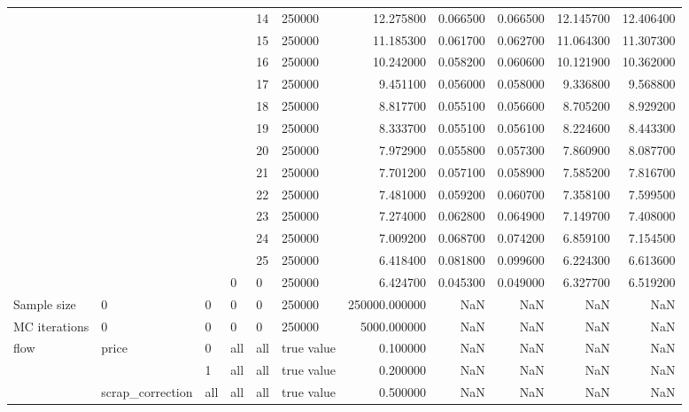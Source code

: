 \begin{tabular}{llllllrrrrr}
\cline{5-11}
 &  &  &  & 14 & 250000 & 12.275800 & 0.066500 & 0.066500 & 12.145700 & 12.406400 \\
\cline{5-11}
 &  &  &  & 15 & 250000 & 11.185300 & 0.061700 & 0.062700 & 11.064300 & 11.307300 \\
\cline{5-11}
 &  &  &  & 16 & 250000 & 10.242000 & 0.058200 & 0.060600 & 10.121900 & 10.362000 \\
\cline{5-11}
 &  &  &  & 17 & 250000 & 9.451100 & 0.056000 & 0.058000 & 9.336800 & 9.568800 \\
\cline{5-11}
 &  &  &  & 18 & 250000 & 8.817700 & 0.055100 & 0.056600 & 8.705200 & 8.929200 \\
\cline{5-11}
 &  &  &  & 19 & 250000 & 8.333700 & 0.055100 & 0.056100 & 8.224600 & 8.443300 \\
\cline{5-11}
 &  &  &  & 20 & 250000 & 7.972900 & 0.055800 & 0.057300 & 7.860900 & 8.087700 \\
\cline{5-11}
 &  &  &  & 21 & 250000 & 7.701200 & 0.057100 & 0.058900 & 7.585200 & 7.816700 \\
\cline{5-11}
 &  &  &  & 22 & 250000 & 7.481000 & 0.059200 & 0.060700 & 7.358100 & 7.599500 \\
\cline{5-11}
 &  &  &  & 23 & 250000 & 7.274000 & 0.062800 & 0.064900 & 7.149700 & 7.408000 \\
\cline{5-11}
 &  &  &  & 24 & 250000 & 7.009200 & 0.068700 & 0.074200 & 6.859100 & 7.154500 \\
\cline{5-11}
 &  &  &  & 25 & 250000 & 6.418400 & 0.081800 & 0.099600 & 6.224300 & 6.613600 \\
\cline{4-11} \cline{5-11}
 &  &  & 0 & 0 & 250000 & 6.424700 & 0.045300 & 0.049000 & 6.327700 & 6.519200 \\
\cline{1-11} \cline{2-11} \cline{3-11} \cline{4-11} \cline{5-11}
Sample size & 0 & 0 & 0 & 0 & 250000 & 250000.000000 & NaN & NaN & NaN & NaN \\
\cline{1-11} \cline{2-11} \cline{3-11} \cline{4-11} \cline{5-11}
MC iterations & 0 & 0 & 0 & 0 & 250000 & 5000.000000 & NaN & NaN & NaN & NaN \\
\cline{1-11} \cline{2-11} \cline{3-11} \cline{4-11} \cline{5-11}
\multirow[t]{37}{*}{flow} & \multirow[t]{2}{*}{price} & 0 & all & all & true value & 0.100000 & NaN & NaN & NaN & NaN \\
\cline{3-11} \cline{4-11} \cline{5-11}
 &  & 1 & all & all & true value & 0.200000 & NaN & NaN & NaN & NaN \\
\cline{2-11} \cline{3-11} \cline{4-11} \cline{5-11}
 & scrap_correction & all & all & all & true value & 0.500000 & NaN & NaN & NaN & NaN \\

\end{tabular}
